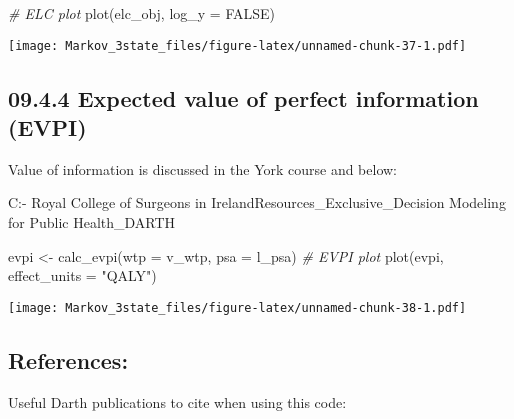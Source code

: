 \documentclass[
]{article}
\newenvironment{Shaded}{\begin{snugshade}}{\end{snugshade}}
\newcommand{\AttributeTok}[1]{\textcolor[rgb]{0.77,0.63,0.00}{#1}}
\newcommand{\CommentTok}[1]{\textcolor[rgb]{0.56,0.35,0.01}{\textit{#1}}}
\newcommand{\ConstantTok}[1]{\textcolor[rgb]{0.00,0.00,0.00}{#1}}
\newcommand{\FunctionTok}[1]{\textcolor[rgb]{0.00,0.00,0.00}{#1}}
\newcommand{\NormalTok}[1]{#1}
\newcommand{\OtherTok}[1]{\textcolor[rgb]{0.56,0.35,0.01}{#1}}
\newcommand{\StringTok}[1]{\textcolor[rgb]{0.31,0.60,0.02}{#1}}
\begin{document}
\begin{Shaded}
\begin{Highlighting}[]
\CommentTok{\# ELC plot}
\FunctionTok{plot}\NormalTok{(elc\_obj, }\AttributeTok{log\_y =} \ConstantTok{FALSE}\NormalTok{)}
\end{Highlighting}
\end{Shaded}

\texttt{[image: Markov\_3state\_files/figure-latex/unnamed-chunk-37-1.pdf]}

\hypertarget{expected-value-of-perfect-information-evpi}{%
\subsection{09.4.4 Expected value of perfect information
(EVPI)}\label{expected-value-of-perfect-information-evpi}}

Value of information is discussed in the York course and below:

C:\Users\Jonathan\OneDrive - Royal College of Surgeons in
Ireland\COLOSSUS\Training Resources\CDC\_Exclusive\_Decision Modeling
for Public Health\_DARTH

\begin{Shaded}
\begin{Highlighting}[]
\NormalTok{evpi }\OtherTok{\textless{}{-}} \FunctionTok{calc\_evpi}\NormalTok{(}\AttributeTok{wtp =}\NormalTok{ v\_wtp, }\AttributeTok{psa =}\NormalTok{ l\_psa)}
\CommentTok{\# EVPI plot}
\FunctionTok{plot}\NormalTok{(evpi, }\AttributeTok{effect\_units =} \StringTok{"QALY"}\NormalTok{)}
\end{Highlighting}
\end{Shaded}

\texttt{[image: Markov\_3state\_files/figure-latex/unnamed-chunk-38-1.pdf]}

\hypertarget{references}{%
\subsection{References:}\label{references}}

Useful Darth publications to cite when using this code:
\end{document}
